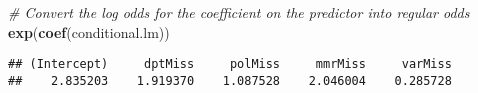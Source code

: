 \documentclass[]{article}
\newenvironment{Shaded}{\begin{snugshade}}{\end{snugshade}}
\newcommand{\CommentTok}[1]{\textcolor[rgb]{0.56,0.35,0.01}{\textit{#1}}}
\newcommand{\DataTypeTok}[1]{\textcolor[rgb]{0.13,0.29,0.53}{#1}}
\newcommand{\KeywordTok}[1]{\textcolor[rgb]{0.13,0.29,0.53}{\textbf{#1}}}
\newcommand{\NormalTok}[1]{#1}
\newcommand{\OperatorTok}[1]{\textcolor[rgb]{0.81,0.36,0.00}{\textbf{#1}}}
\newcommand{\StringTok}[1]{\textcolor[rgb]{0.31,0.60,0.02}{#1}}
\begin{document}
\begin{Shaded}
\begin{Highlighting}[]
\CommentTok{# Convert the log odds for the coefficient on the predictor into regular odds}
\KeywordTok{exp}\NormalTok{(}\KeywordTok{coef}\NormalTok{(conditional.lm))}
\end{Highlighting}
\end{Shaded}

\begin{verbatim}
## (Intercept)     dptMiss     polMiss     mmrMiss     varMiss 
##    2.835203    1.919370    1.087528    2.046004    0.285728
\end{verbatim}

\begin{Shaded}
\end{Shaded}
\end{document}

